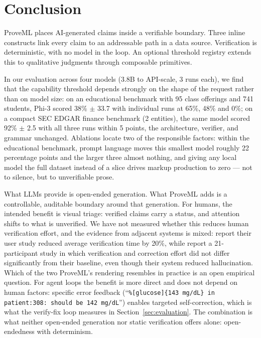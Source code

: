 \documentclass[11pt,a4paper]{article}
\begin{document}
\section{Conclusion}

ProveML places AI-generated claims inside a verifiable boundary. Three inline constructs link every claim to an addressable path in a data source. Verification is deterministic, with no model in the loop. An optional threshold registry extends this to qualitative judgments through composable primitives.

In our evaluation across four models (3.8B to API-scale, 3 runs each), we find that the capability threshold depends strongly on the shape of the request rather than on model size: on an educational benchmark with 95 class offerings and 741 students, Phi-3 scored 38\% $\pm$ 33.7 with individual runs at 65\%, 48\% and 0\%; on a compact SEC EDGAR finance benchmark (2 entities), the same model scored 92\% $\pm$ 2.5 with all three runs within 5 points, the architecture, verifier, and grammar unchanged. Ablations locate two of the responsible factors: within the educational benchmark, prompt language moves this smallest model roughly 22 percentage points and the larger three almost nothing, and giving any local model the full dataset instead of a slice drives markup production to zero --- not to silence, but to unverifiable prose.

What LLMs provide is open-ended generation. What ProveML adds is a controllable, auditable boundary around that generation. For humans, the intended benefit is visual triage: verified claims carry a status, and attention shifts to what is unverified. We have not measured whether this reduces human verification effort, and the evidence from adjacent systems is mixed: \citet{symgen} report their user study reduced average verification time by 20\%, while \citet{ten2026} report a 21-participant study in which verification and correction effort did not differ significantly from their baseline, even though their system reduced hallucination. Which of the two ProveML's rendering resembles in practice is an open empirical question. For agent loops the benefit is more direct and does not depend on human factors: specific error feedback (``\texttt{\%[glucose]\{143 mg/dL\} in patient:308: should be 142 mg/dL}'') enables targeted self-correction, which is what the verify-fix loop measures in Section~\ref{sec:evaluation}. The combination is what neither open-ended generation nor static verification offers alone: open-endedness with determinism.
\end{document}
